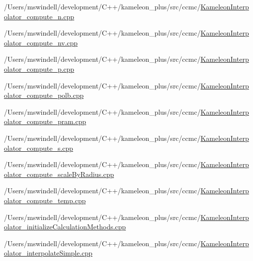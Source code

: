 \begin{DoxyCompactItemize}
/\-Users/mswindell/development/\-C++/kameleon\-\_\-plus/src/ccmc/\hyperlink{_kameleon_interpolator__compute__n_8cpp}{Kameleon\-Interpolator\-\_\-compute\-\_\-n.\-cpp}\item 
/\-Users/mswindell/development/\-C++/kameleon\-\_\-plus/src/ccmc/\hyperlink{_kameleon_interpolator__compute__nv_8cpp}{Kameleon\-Interpolator\-\_\-compute\-\_\-nv.\-cpp}\item 
/\-Users/mswindell/development/\-C++/kameleon\-\_\-plus/src/ccmc/\hyperlink{_kameleon_interpolator__compute__p_8cpp}{Kameleon\-Interpolator\-\_\-compute\-\_\-p.\-cpp}\item 
/\-Users/mswindell/development/\-C++/kameleon\-\_\-plus/src/ccmc/\hyperlink{_kameleon_interpolator__compute__polb_8cpp}{Kameleon\-Interpolator\-\_\-compute\-\_\-polb.\-cpp}\item 
/\-Users/mswindell/development/\-C++/kameleon\-\_\-plus/src/ccmc/\hyperlink{_kameleon_interpolator__compute__pram_8cpp}{Kameleon\-Interpolator\-\_\-compute\-\_\-pram.\-cpp}\item 
/\-Users/mswindell/development/\-C++/kameleon\-\_\-plus/src/ccmc/\hyperlink{_kameleon_interpolator__compute__s_8cpp}{Kameleon\-Interpolator\-\_\-compute\-\_\-s.\-cpp}\item 
/\-Users/mswindell/development/\-C++/kameleon\-\_\-plus/src/ccmc/\hyperlink{_kameleon_interpolator__compute__scale_by_radius_8cpp}{Kameleon\-Interpolator\-\_\-compute\-\_\-scale\-By\-Radius.\-cpp}\item 
/\-Users/mswindell/development/\-C++/kameleon\-\_\-plus/src/ccmc/\hyperlink{_kameleon_interpolator__compute__temp_8cpp}{Kameleon\-Interpolator\-\_\-compute\-\_\-temp.\-cpp}\item 
/\-Users/mswindell/development/\-C++/kameleon\-\_\-plus/src/ccmc/\hyperlink{_kameleon_interpolator__initialize_calculation_methods_8cpp}{Kameleon\-Interpolator\-\_\-initialize\-Calculation\-Methods.\-cpp}\item 
/\-Users/mswindell/development/\-C++/kameleon\-\_\-plus/src/ccmc/\hyperlink{_kameleon_interpolator__interpolate_simple_8cpp}{Kameleon\-Interpolator\-\_\-interpolate\-Simple.\-cpp}\end{DoxyCompactItemize}
